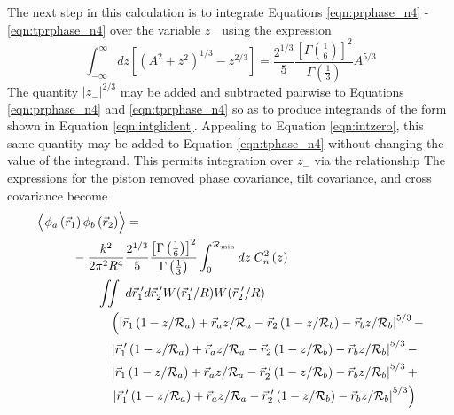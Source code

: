 The next step in this calculation is to integrate Equations
\ref{eqn:prphase_n4} - \ref{eqn:tprphase_n4} over the variable $z_{-}$
using the expression 
\begin{equation}\label{eqn:intglident}
\int_{-\infty}^{\infty} dz\left[\left(A^{2} + z^{2}\right)^{1/3} - z^{2/3}\right] = 
\frac{2^{1/3}}{5}\frac{\left[\Gamma\left(\frac{1}{6}\right)\right]^{2}}{\Gamma\left(\frac{1}{3}\right)} A^{5/3}
\end{equation}
The quantity $\left\vert z_{-}\right\vert^{2/3}$ may be added and
subtracted pairwise to Equations \ref{eqn:prphase_n4} and
\ref{eqn:tprphase_n4} so as to produce integrands of the form shown in
Equation \ref{eqn:intglident}.  Appealing to Equation \ref{eqn:intzero}, this
same quantity may be added to Equation \ref{eqn:tphase_n4} without
changing the value of the integrand.  This permits integration over
$z_{-}$ via the relationship The expressions for the piston removed
phase covariance, tilt covariance, and cross covariance become
\begin{equation}\label{eqn:prphase_n5}
\begin{aligned}
&\left\langle \vphantom{\hat{\phi}_{a}} \phi_{a}\left(\vec{r}_{1}\right) \phi_{b}\left(\vec{r}_{2}\right)\right\rangle = \\
&\quad\quad\quad
-\frac{k^{2}}{2\pi^{2}R^{4}} 
\frac{2^{1/3}}{5}\frac{\left[\Gamma\left(\frac{1}{6}\right)\right]^{2}}{\Gamma\left(\frac{1}{3}\right)} 
\int_{0}^{\mathcal{R}_{\rm min}} dz\;C_{n}^{2}\left(z\right) \\
&\quad\quad\quad\quad\quad
\iint \; d\vec{r}^{\;\prime}_{1}d\vec{r}^{\;\prime}_{2}  
W(\vec{r}^{\;\prime}_{1}/R) W(\vec{r}^{\;\prime}_{2}/R) \\
&\quad\quad\quad\quad\quad\quad
\left(
\left\vert \vec{r}_{1}\left(1-z/\mathcal{R}_{a}\right) + \vec{r}_{a} z/\mathcal{R}_{a} - 
\vec{r}_{2}\left(1-z/\mathcal{R}_{b}\right) - \vec{r}_{b} z/\mathcal{R}_{b}\right\vert^{5/3} -
\right. \\
& \quad\quad\quad\quad\quad\quad
\left\vert \vec{r}^{\;\prime}_{1}\left(1-z/\mathcal{R}_{a}\right) + \vec{r}_{a} z/\mathcal{R}_{a} - 
\vec{r}_{2}\left(1-z/\mathcal{R}_{b}\right) - \vec{r}_{b} z/\mathcal{R}_{b}\right\vert^{5/3} - \\
& \quad\quad\quad\quad\quad\quad
\left\vert \vec{r}_{1}\left(1-z/\mathcal{R}_{a}\right) + \vec{r}_{a} z/\mathcal{R}_{a} - 
\vec{r}^{\;\prime}_{2}\left(1-z/\mathcal{R}_{b}\right) - \vec{r}_{b} z/\mathcal{R}_{b}\right\vert^{5/3} + \\
& \quad\quad\quad\quad\quad\quad
\left.
\left\vert \vec{r}^{\;\prime}_{1}\left(1-z/\mathcal{R}_{a}\right) + \vec{r}_{a} z/\mathcal{R}_{a} - 
\vec{r}^{\;\prime}_{2}\left(1-z/\mathcal{R}_{b}\right) - \vec{r}_{b} z/\mathcal{R}_{b}\right\vert^{5/3}\right)
\end{aligned}
\end{equation}

